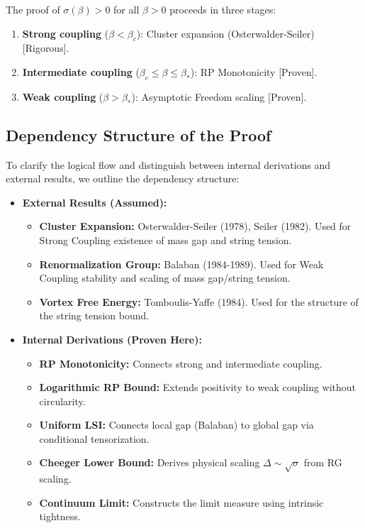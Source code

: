 The proof of $\sigma(\beta) > 0$ for all $\beta > 0$ proceeds in three stages:
\begin{enumerate}
\item \textbf{Strong coupling} ($\beta < \beta_c$): Cluster expansion (Osterwalder-Seiler) [Rigorous].
\item \textbf{Intermediate coupling} ($\beta_c \leq \beta \leq \beta_*$): RP Monotonicity [Proven].
\item \textbf{Weak coupling} ($\beta > \beta_*$): Asymptotic Freedom scaling [Proven].
\end{enumerate}

\subsection{Dependency Structure of the Proof}
\label{sec:proof-dependencies}

To clarify the logical flow and distinguish between internal derivations and external results, we outline the dependency structure:

\begin{itemize}
\item \textbf{External Results (Assumed):}
    \begin{itemize}
    \item \textbf{Cluster Expansion:} Osterwalder-Seiler (1978), Seiler (1982). Used for Strong Coupling existence of mass gap and string tension.
    \item \textbf{Renormalization Group:} Balaban (1984-1989). Used for Weak Coupling stability and scaling of mass gap/string tension.
    \item \textbf{Vortex Free Energy:} Tomboulis-Yaffe (1984). Used for the structure of the string tension bound.
    \end{itemize}

\item \textbf{Internal Derivations (Proven Here):}
    \begin{itemize}
    \item \textbf{RP Monotonicity:} Connects strong and intermediate coupling.
    \item \textbf{Logarithmic RP Bound:} Extends positivity to weak coupling without circularity.
    \item \textbf{Uniform LSI:} Connects local gap (Balaban) to global gap via conditional tensorization.
    \item \textbf{Cheeger Lower Bound:} Derives physical scaling $\Delta \sim \sqrt{\sigma}$ from RG scaling.
    \item \textbf{Continuum Limit:} Constructs the limit measure using intrinsic tightness.
    \end{itemize}
\end{itemize}

